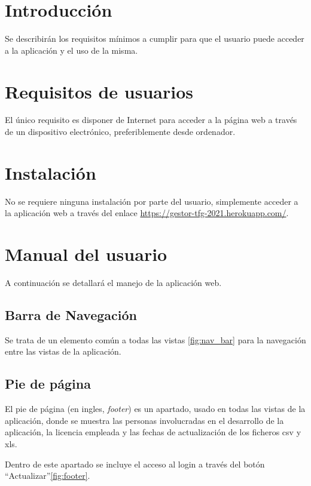 
\section{Introducción}
Se describirán los requisitos mínimos a cumplir para que el usuario puede acceder a la aplicación y el uso de la misma.

\section{Requisitos de usuarios}
El único requisito es disponer de Internet para acceder a la página web a través de un dispositivo electrónico, preferiblemente desde ordenador.

\section{Instalación}
No se requiere ninguna instalación por parte del usuario, simplemente acceder a la aplicación web a través del enlace \href{https://gestor-tfg-2021.herokuapp.com/}{https://gestor-tfg-2021.herokuapp.com/}.

\section{Manual del usuario}
A continuación se detallará el manejo de la aplicación web.

\subsection{Barra de Navegación}

Se trata de un elemento común a todas las vistas \ref{fig:nav_bar} para la navegación entre las vistas de la aplicación. 


\subsection{Pie de página}
El pie de página (en ingles, \emph{footer}) es un apartado, usado en todas las vistas de la aplicación, donde se muestra las personas involucradas en el desarrollo de la aplicación, la licencia empleada y las fechas de actualización de los ficheros csv y xls.

Dentro de este apartado se incluye el acceso al login a través del botón ``Actualizar''\ref{fig:footer}. 

